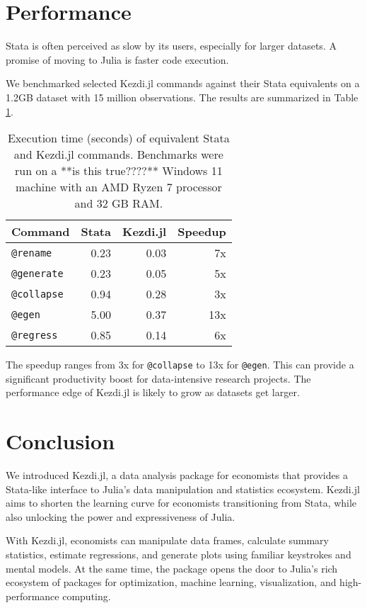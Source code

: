 \documentclass{juliacon}
\begin{document}
\section{Performance}

Stata is often perceived as slow by its users, especially for larger datasets. A promise of moving to Julia is faster code execution.

We benchmarked selected Kezdi.jl commands against their Stata equivalents on a 1.2GB dataset with 15 million observations. The results are summarized in Table \ref{tab:benchmark}.

\begin{table}[ht]
	\centering
	\begin{tabular}{lrrr}
		\hline
		Command            & Stata & Kezdi.jl & Speedup \\
		\hline
		\texttt{@rename}   & 0.23  & 0.03     & 7x      \\
		\texttt{@generate} & 0.23  & 0.05     & 5x      \\
		\texttt{@collapse} & 0.94  & 0.28     & 3x      \\
		\texttt{@egen}     & 5.00  & 0.37     & 13x     \\
		\texttt{@regress}  & 0.85  & 0.14     & 6x      \\
		\hline
	\end{tabular}
	\caption{Execution time (seconds) of equivalent Stata and Kezdi.jl commands. Benchmarks were run on a **is this true????** Windows 11 machine with an AMD Ryzen 7 processor and 32 GB RAM.}
	\label{tab:benchmark}
\end{table}

The speedup ranges from 3x for \texttt{@collapse} to 13x for \texttt{@egen}. This can provide a significant productivity boost for data-intensive research projects. The performance edge of Kezdi.jl is likely to grow as datasets get larger.

\section{Conclusion}

We introduced Kezdi.jl, a data analysis package for economists that provides a Stata-like interface to Julia's data manipulation and statistics ecosystem. Kezdi.jl aims to shorten the learning curve for economists transitioning from Stata, while also unlocking the power and expressiveness of Julia.

With Kezdi.jl, economists can manipulate data frames, calculate summary statistics, estimate regressions, and generate plots using familiar keystrokes and mental models. At the same time, the package opens the door to Julia's rich ecosystem of packages for optimization, machine learning, visualization, and high-performance computing.
\end{document}
